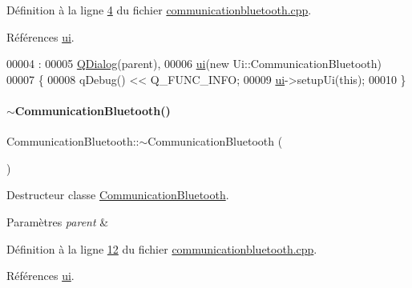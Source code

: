 Définition à la ligne \hyperlink{communicationbluetooth_8cpp_source_l00004}{4} du fichier \hyperlink{communicationbluetooth_8cpp_source}{communicationbluetooth.\+cpp}.



Références \hyperlink{communicationbluetooth_8h_source_l00038}{ui}.


\begin{DoxyCode}
00004                                                               :
00005     \hyperlink{class_q_dialog}{QDialog}(parent),
00006     \hyperlink{class_communication_bluetooth_a2721cf9f9503a98770981ffdad09f9a1}{ui}(\textcolor{keyword}{new} Ui::CommunicationBluetooth)
00007 \{
00008      qDebug() << Q\_FUNC\_INFO;
00009     \hyperlink{class_communication_bluetooth_a2721cf9f9503a98770981ffdad09f9a1}{ui}->setupUi(\textcolor{keyword}{this});
00010 \}
\end{DoxyCode}
\mbox{\label{class_communication_bluetooth_a13c72d24359f40c204e94f3ef1ab6fd3}} 
\paragraph{\texorpdfstring{$\sim$\+Communication\+Bluetooth()}{~CommunicationBluetooth()}}
{\footnotesize\ttfamily Communication\+Bluetooth\+::$\sim$\+Communication\+Bluetooth (\begin{DoxyParamCaption}{ }\end{DoxyParamCaption})}



Destructeur classe \hyperlink{class_communication_bluetooth}{Communication\+Bluetooth}. 


\begin{DoxyParams}{Paramètres}
{\em parent} & \\
\hline
\end{DoxyParams}


Définition à la ligne \hyperlink{communicationbluetooth_8cpp_source_l00012}{12} du fichier \hyperlink{communicationbluetooth_8cpp_source}{communicationbluetooth.\+cpp}.



Références \hyperlink{communicationbluetooth_8h_source_l00038}{ui}.



